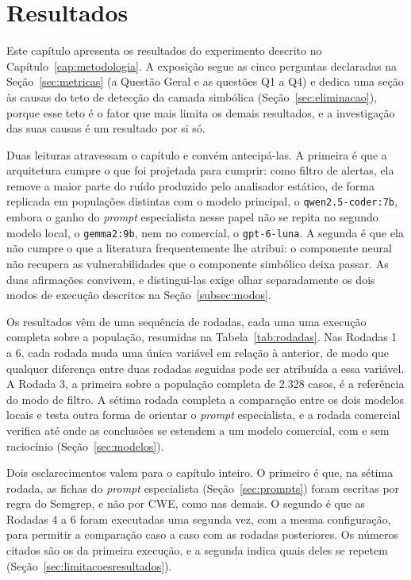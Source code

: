 \chapter{Resultados}
\label{cap:resultados}

Este capítulo apresenta os resultados do experimento descrito no Capítulo~\ref{cap:metodologia}. A exposição segue as cinco perguntas declaradas na Seção~\ref{sec:metricas} (a Questão Geral e as questões Q1 a Q4) e dedica uma seção às causas do teto de detecção da camada simbólica (Seção~\ref{sec:eliminacao}), porque esse teto é o fator que mais limita os demais resultados, e a investigação das suas causas é um resultado por si só.

Duas leituras atravessam o capítulo e convém antecipá-las. A primeira é que a arquitetura cumpre o que foi projetada para cumprir: como filtro de alertas, ela remove a maior parte do ruído produzido pelo analisador estático, de forma replicada em populações distintas com o modelo principal, o \texttt{qwen2.5-coder:7b}, embora o ganho do \textit{prompt} especialista nesse papel não se repita no segundo modelo local, o \texttt{gemma2:9b}, nem no comercial, o \texttt{gpt-6-luna}. A segunda é que ela não cumpre o que a literatura frequentemente lhe atribui: o componente neural não recupera as vulnerabilidades que o componente simbólico deixa passar. As duas afirmações convivem, e distingui-las exige olhar separadamente os dois modos de execução descritos na Seção~\ref{subsec:modos}.

Os resultados vêm de uma sequência de rodadas, cada uma uma execução completa sobre a população, resumidas na Tabela~\ref{tab:rodadas}. Nas Rodadas 1 a 6, cada rodada muda uma única variável em relação à anterior, de modo que qualquer diferença entre duas rodadas seguidas pode ser atribuída a essa variável. A Rodada 3, a primeira sobre a população completa de 2.328 casos, é a referência do modo de filtro. A sétima rodada completa a comparação entre os dois modelos locais e testa outra forma de orientar o \textit{prompt} especialista, e a rodada comercial verifica até onde as conclusões se estendem a um modelo comercial, com e sem raciocínio (Seção~\ref{sec:modelos}).

Dois esclarecimentos valem para o capítulo inteiro. O primeiro é que, na sétima rodada, as fichas do \textit{prompt} especialista (Seção~\ref{sec:prompts}) foram escritas por regra do Semgrep, e não por CWE, como nas demais. O segundo é que as Rodadas 4 a 6 foram executadas uma segunda vez, com a mesma configuração, para permitir a comparação caso a caso com as rodadas posteriores. Os números citados são os da primeira execução, e a segunda indica quais deles se repetem (Seção~\ref{sec:limitacoesresultados}).

